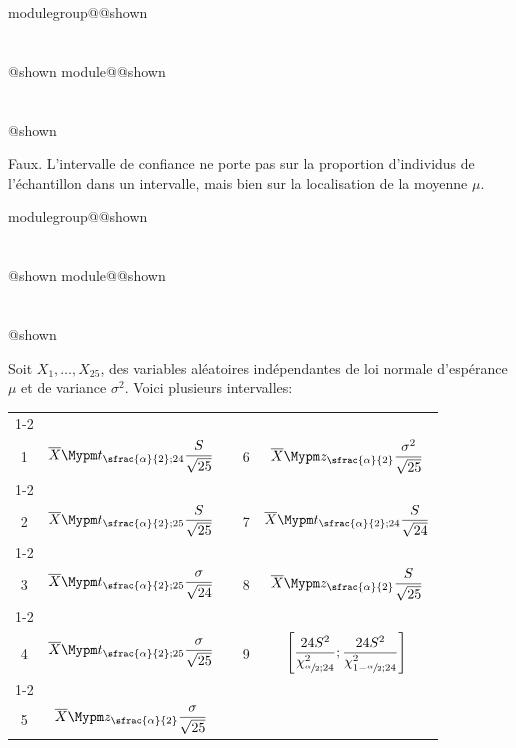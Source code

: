 \documentclass{Evaluation}
\makeatletter
\newcommand{\currentmodulekey}{}
\newcommand{\currentmoduletitle}{}
\newcommand{\currentgroupkey}{}
\newcommand{\currentgrouptitle}{}
\newcommand{\showmoduleifneeded}{%
  \ifx\currentgroupkey\empty\else
    \expandafter\ifx\csname modulegroup@\currentgroupkey @shown\endcsname\relax
      \section*{\currentgrouptitle}%
      \expandafter\gdef\csname modulegroup@\currentgroupkey @shown\endcsname{1}%
    \fi
  \fi
  \expandafter\ifx\csname module@\currentmodulekey @shown\endcsname\relax
    \section*{\currentmoduletitle}%
    \expandafter\gdef\csname module@\currentmodulekey @shown\endcsname{1}%
  \fi
}
\newenvironment{H24}{\showmoduleifneeded}{}
\newenvironment{H26}{\showmoduleifneeded}{}
\makeatother
\begin{document}
\begin{questions}
\begin{H26}
\begin{parts}
    \begin{solution}
        Faux. L'intervalle de confiance ne porte pas sur la proportion d'individus de l'échantillon dans un intervalle, mais bien sur la localisation de la moyenne $\mu$.
    \end{solution}

\end{parts}

\end{H26}

\begin{H24}
\question {} %
Soit $X_1,\hdots, X_{25}$, des variables aléatoires indépendantes de loi normale d'espérance $\mu$ et de variance $\sigma^2$. Voici plusieurs intervalles:
\begin{center}

\begin{tabular}{|c|c|c|c|c|}
	\cline{1-2}\cline{4-5}
	&&&&\\[-3mm]

	1 &  $\displaystyle \overline {X}\Mypm t_{\sfrac{\alpha}{2};24}\frac{S}{\sqrt{25}}$


	 & \hspace{0.3cm} &
	 6 &  $\displaystyle \overline {X}\Mypm z_{\sfrac{\alpha}{2}}\frac{\sigma^2}{\sqrt{25}}$

	\\[4mm]
	\cline{1-2}\cline{4-5}
	&&&&\\[-3mm]
	 2 & $\displaystyle \overline {X}\Mypm t_{\sfrac{\alpha}{2};25}\frac{S}{\sqrt{25}}$

	&  &
	 7 & $\displaystyle \overline {X}\Mypm t_{\sfrac{\alpha}{2};24}\frac{S}{\sqrt{24}}$

	\\[4mm]
	\cline{1-2}\cline{4-5}
	&&&&\\[-3mm]
	 3 & $\displaystyle \overline {X}\Mypm t_{\sfrac{\alpha}{2};25}\frac{\sigma}{\sqrt{24}}$

	 &  &
	  8 & $\displaystyle \overline {X}\Mypm z_{\sfrac{\alpha}{2}}\frac{S}{\sqrt{25}}$

	 \\[4mm]
	 \cline{1-2}\cline{4-5}
	 &&&&\\[-3mm]
	   4 & $\displaystyle \overline {X}\Mypm t_{\sfrac{\alpha}{2};25}\frac{\sigma}{\sqrt{25}}$

	 &  &
	  9 & $\displaystyle \left[\frac{24S^2}{\chi_{\sfrac{\alpha}{2};24}^2};\frac{24S^2}{\chi_{1-\sfrac{\alpha}{2};24}^2}\right]$

	 \\[5mm]
	 \cline{1-2}\cline{4-5}
	 &&&&\\[-3mm]
	  5 & $\displaystyle \overline {X}\Mypm z_{\sfrac{\alpha}{2}}\frac{\sigma}{\sqrt{25}}$


\end{tabular}
\end{center}
\end{H24}
\end{questions}
\end{document}
